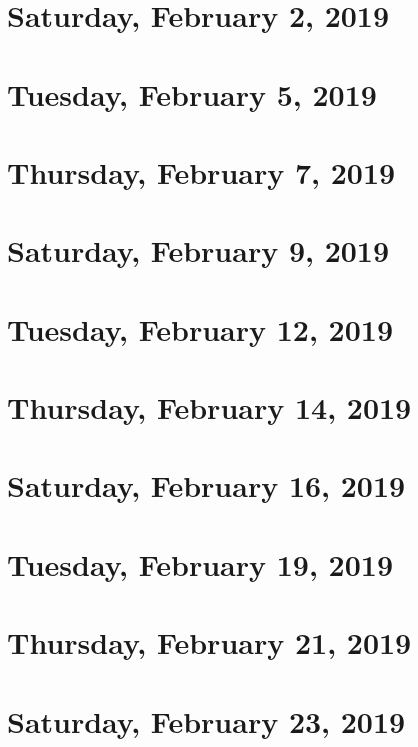 \documentclass[reqno]{amsart}
\begin{document}
\section{Saturday, February 2, 2019}
    
    
\section{Tuesday, February 5, 2019}
    

\section{Thursday, February 7, 2019}
    

\section{Saturday, February 9, 2019}
    
    
\section{Tuesday, February 12, 2019}
    

\section{Thursday, February 14, 2019}
    

\section{Saturday, February 16, 2019}
    

\section{Tuesday, February 19, 2019}
    

\section{Thursday, February 21, 2019}
    

\section{Saturday, February 23, 2019}
    
\end{document}
